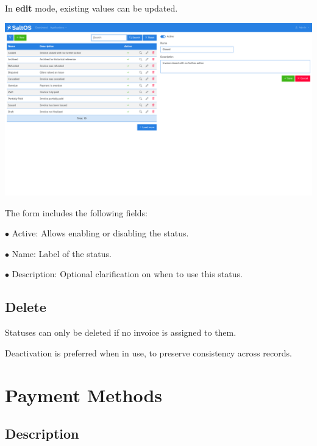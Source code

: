 \documentclass[a4paper]{article}
\begin{document}
In \textbf{edit} mode, existing values can be updated.

\begin{center}\includegraphics[width=1\textwidth]{../ujest/snaps/test-screenshots-js-screenshots-sales-invoices-status-edit-10-en-us-1-snap.png}\end{center}

The form includes the following fields:

\begin{compactitem}
\item[\color{myblue}$\bullet$] Active: Allows enabling or disabling the status.
\item[\color{myblue}$\bullet$] Name: Label of the status.
\item[\color{myblue}$\bullet$] Description: Optional clarification on when to use this status.
\end{compactitem}

\hypertarget{toc145}{}
\subsection{Delete}

Statuses can only be deleted if no invoice is assigned to them.

Deactivation is preferred when in use, to preserve consistency across records.


\hypertarget{toc146}{}
\section{Payment Methods}

\hypertarget{toc147}{}
\subsection{Description}
\end{document}
